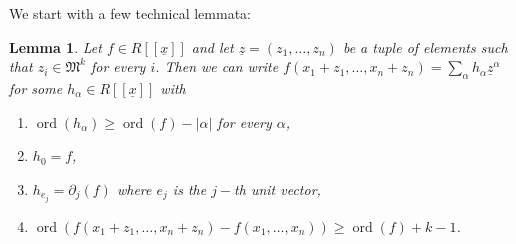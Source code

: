 \documentclass{article}
\newtheorem{lemma}[theorem]{Lemma}
\DeclareMathOperator{\ord}{ord}
\numberwithin{theorem}{section}
\begin{document}
We start with a few technical lemmata:

\begin{lemma}\label{lem:app_computation}
    Let $f \in R[[\underline{x}]]$ and let $\underline{z}=(z_1, \dots, z_n)$ be a tuple of elements such that $z_i \in \mathfrak{M}^k$ for every $i$. Then we can write $f(x_1+z_1, \dots, x_n+z_n)=\sum_{\alpha} h_\alpha \underline{z}^\alpha$ for some $h_\alpha \in R[[\underline{x}]]$ with
    \begin{enumerate}
        \item $\ord(h_\alpha) \geq \ord(f) - |\alpha|$ for every $\alpha$, 
        \item $h_0=f$,
        \item $h_{e_j}=\partial_j(f)$ where $e_j$ is the $j-$th unit vector,
        \item $\ord(f(x_1+z_1, \dots, x_n+z_n) -  f(x_1, \dots, x_n)) \geq  \ord(f)+k-1$.
    \end{enumerate}
\end{lemma}
\end{document}
